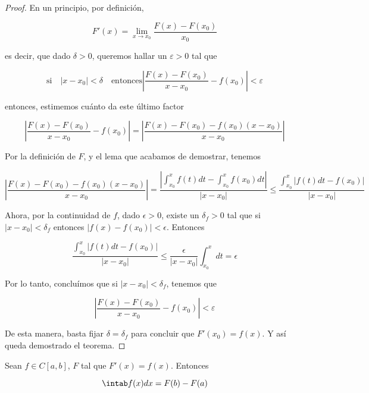 \begin{proof}
    En un principio, por definición,
    
    \[
    F'(x) = \lim_{x \to x_0} \frac{F(x) - F(x_0)}{x_0}
    \]
    
    \noindent es decir, que dado $\delta > 0$, queremos hallar un $\varepsilon > 0$ tal que
    
    \[
    \text{si} \quad |x - x_0| < \delta \quad \text{entonces} \left| \frac{F(x) - F(x_0)}{x-x_0} - f(x_0) \right| < \varepsilon
    \]
    
    \noindent entonces, estimemos cuánto da este último factor
    
    \[
    \left| \frac{F(x) - F(x_0)}{x-x_0} - f(x_0) \right| = \left| \frac{F(x) - F(x_0) - f(x_0)(x-x_0)}{x-x_0} \right|
    \]
    
    Por la definición de $F$, y el lema que acabamos de demostrar, tenemos
    
    \[
    \left|\dfrac{F(x) - F(x_0) - f(x_0)(x-x_0)}{x-x_0}\right| = \dfrac{\left| \int_{x_0}^x f(t)dt - \int_{x_0}^x f(x_0)dt  \right|}{|x-x_0|} \leq \dfrac{\int_{x_0}^x |f(t)dt - f(x_0)|}{|x-x_0|}
    \]
    
    Ahora, por la continuidad de $f$, dado $\epsilon > 0$, existe un $\delta_f > 0$ tal que si $|x-x_0| < \delta_f$ entonces $|f(x)-f(x_0)| < \epsilon$. Entonces
    
    \[
    \dfrac{\int_{x_0}^x |f(t)dt - f(x_0)|}{|x-x_0|} \leq \frac{\epsilon}{|x-x_0|}\int_{x_0}^xdt = \epsilon
    \]
    
    Por lo tanto, concluímos que si $|x-x_0| < \delta_f$, tenemos que
    
    \[
    \left| \frac{F(x) - F(x_0)}{x-x_0} - f(x_0) \right| < \varepsilon
    \]
    
    De esta manera, basta fijar $\delta = \delta_f$ para concluir que $F'(x_0) = f(x)$. Y así queda demostrado el teorema.
\end{proof}

\begin{teo}\label{teo:2TFC}
    Sean $f \in C[a,b]$, $F$ tal que $F'(x) = f(x)$. Entonces
    
    \[
    \intab f(x)dx = F(b) - F(a)
    \]
\end{teo}

